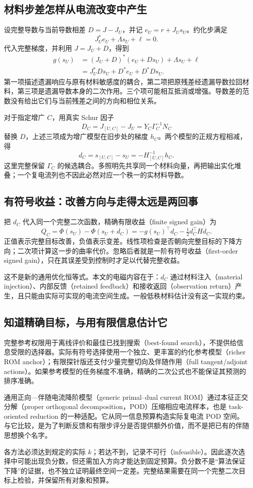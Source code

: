 \subsection{材料步差怎样从电流改变中产生}
设完整导数与当前导数相差 $D=J-J_U$，并记 $e_U=r+J_Us_U$。约化步满足
\[
 J_U^*e_U+\Lambda s_U+\ell=0.
\]
代入完整梯度，并利用 $J=J_U+D$，得到
\[
 \begin{aligned}
 g(s_U)&=(J_U+D)^*(e_U+Ds_U)+\Lambda s_U+\ell\\
 &=J_U^*Ds_U+D^*e_U+D^*Ds_U.
 \end{aligned}
\]
第一项描述遗漏响应与原有材料敏感度的耦合，第二项把原残差经遗漏导数拉回材料，第三项是遗漏导数本身的二次作用。三个项可能相互抵消或增强。导数差的范数没有给出它们与当前残差之间的方向和相位关系。

对于指定增广 $C$，用真实 Schur 因子
\[
 D_C=J_{[U,C]}-J_U=Y_C\Gamma_C^{-1}N_C
\]
替换 $D$，上述三项成为增广模型在旧步处的梯度 $h_C$。两个模型的正规方程相减，得
\[
 d_C=s_{[U,C]}-s_U=-H_{[U,C]}^{-1}h_C.
\]
这里完整保留 $\Gamma_C$ 的候选耦合。多照明先共享同一个材料向量，再把输出实化堆叠；一个复电流列也不因此必然对应一个秩一的实材料导数。

\subsection{有符号收益：改善方向与走得太远是两回事}
把 $d_C$ 代入同一个完整二次函数，精确有限收益（finite signed gain）为
\[
 Q_C=\Phi(s_U)-\Phi(s_U+d_C)
 =-g(s_U)^\top d_C-\tfrac12d_C^\top Hd_C.
\]
正值表示完整目标改善，负值表示变差。线性项检查是否朝向完整目标的下降方向；二次项计算这一步的曲率代价。忽略后者就是一阶有符号收益（first-order signed gain），只在其误差受到控制时才足以代替完整收益。

这不是新的通用优化恒等式。本文的电磁内容在于：$d_C$ 通过材料注入（material injection）、内部反馈（retained feedback）和接收返回（observation return）产生，且只能由实际可实现的电流空间生成。一般低秩材料估计没有这一实现约束。

\subsection{知道精确目标，与用有限信息估计它}
完整参考权限用于离线评价和最佳已找到搜索（best-found search），不提供给信息受限的选择器。实际有符号选择使用一个独立、更丰富的约化参考模型（richer ROM anchor）；有限探针版还支付少量完整切向及伴随作用（full tangent/adjoint actions）。如果参考模型的任务梯度不准确，精确的二次公式也不能保证其预测的排序准确。

通用正向—伴随电流降阶模型（generic primal--dual current ROM）通过本征正交分解（proper orthogonal decomposition，POD）压缩相应电流样本，也是 task-oriented reduction 的一种适配。它从同一信息预算构造实际复电流 POD 空间。与它比较，是为了判断反馈和有限步评分是否提供额外价值，而不是把已有的伴随思想换个名字。

各方法必须达到规定的实际 $k$；若达不到，记录不可行（infeasible）。因此逐次选择中可能出现负分数，但还需加入方向才能达到固定预算。负分数不是“算法保证下降”的证据，也不独立证明最终空间一定差。完整结果需要在同一个完整二次目标上检验，并保留所有对象和预算。
